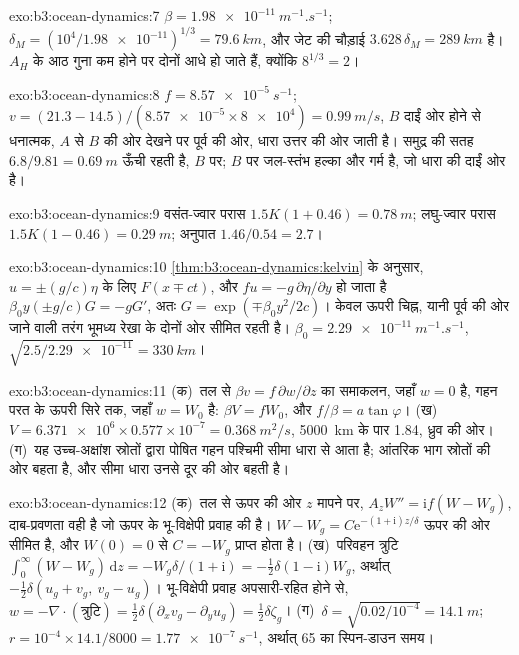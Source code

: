 \begin{solution}{exo:b3:ocean-dynamics:7}
$\beta = \qty{1.98e-11}{m^{-1}.s^{-1}}$; $\delta_M = (10^4/\num{1.98e-11})^{1/3}
= \qty{79.6}{km}$, और जेट की चौड़ाई $3.628\,\delta_M = \qty{289}{km}$ है।
$A_H$ के आठ गुना कम होने पर दोनों आधे हो जाते हैं, क्योंकि $8^{1/3} = 2$।
\end{solution}

\begin{solution}{exo:b3:ocean-dynamics:8}
$f = \qty{8.57e-5}{s^{-1}}$; $v = (21.3 - 14.5)/(\num{8.57e-5}\times\num{8e4})
= \qty{0.99}{m/s}$, $B$ दाईं ओर होने से धनात्मक, $A$ से $B$ की ओर देखने पर
पूर्व की ओर, धारा उत्तर की ओर जाती है। समुद्र की सतह
$6.8/9.81 = \qty{0.69}{m}$ ऊँची रहती है, $B$ पर;
$B$ पर जल-स्तंभ हल्का और गर्म है, जो धारा की दाईं ओर है।
\end{solution}

\begin{solution}{exo:b3:ocean-dynamics:9}
वसंत-ज्वार परास $1.5K(1 + 0.46) = \qty{0.78}{m}$; लघु-ज्वार परास $1.5K(1 - 0.46)
= \qty{0.29}{m}$; अनुपात $1.46/0.54 = 2.7$।
\end{solution}

\begin{solution}{exo:b3:ocean-dynamics:10}
\cref{thm:b3:ocean-dynamics:kelvin} के अनुसार, $u = \pm(g/c)\eta$ के लिए $F(x \mp
ct)$, और $fu = -g\,\partial\eta/\partial y$ हो जाता है $\beta_0y(\pm g/c)G =
-gG'$, अतः $G = \exp(\mp\beta_0y^2/2c)$। केवल ऊपरी चिह्न, यानी पूर्व की ओर जाने वाली
तरंग भूमध्य रेखा के दोनों ओर सीमित रहती है। $\beta_0 =
\qty{2.29e-11}{m^{-1}.s^{-1}}$, $\sqrt{2.5/\num{2.29e-11}} = \qty{330}{km}$।
\end{solution}

\begin{solution}{exo:b3:ocean-dynamics:11}
(क)~तल से $\beta v = f\,\partial w/\partial z$ का समाकलन, जहाँ $w = 0$ है,
गहन परत के ऊपरी सिरे तक, जहाँ $w = W_0$ है: $\beta V = fW_0$, और $f/\beta =
a\tan\varphi$। (ख)~$V = \num{6.371e6}\times0.577\times10^{-7} =
\qty{0.368}{m^2/s}$, \qty{5000}{km} के पार \qty{1.84}{\sverdrup}, ध्रुव की ओर।
(ग)~यह उच्च-अक्षांश स्रोतों द्वारा पोषित गहन पश्चिमी सीमा धारा से आता है;
आंतरिक भाग स्रोतों की ओर बहता है, और सीमा धारा उनसे दूर की ओर
बहती है।
\end{solution}

\begin{solution}{exo:b3:ocean-dynamics:12}
(क)~तल से ऊपर की ओर $z$ मापने पर, $A_zW'' = \mathrm if(W - W_g)$,
दाब-प्रवणता वही है जो ऊपर के भू-विक्षेपी प्रवाह की है। $W - W_g =
C\mathrm e^{-(1+\mathrm i)z/\delta}$ ऊपर की ओर सीमित है, और $W(0) = 0$ से
$C = -W_g$ प्राप्त होता है। (ख)~परिवहन त्रुटि $\int_0^\infty(W - W_g)\,\mathrm dz
= -W_g\delta/(1+\mathrm i) = -\tfrac12\delta(1 - \mathrm i)W_g$, अर्थात्
$-\tfrac12\delta(u_g + v_g,\ v_g - u_g)$। भू-विक्षेपी प्रवाह
अपसारी-रहित होने से, $w = -\nabla\cdot(\text{त्रुटि}) = \tfrac12\delta(\partial_x
v_g - \partial_y u_g) = \tfrac12\delta\zeta_g$। (ग)~$\delta =
\sqrt{0.02/10^{-4}} = \qty{14.1}{m}$; $r = 10^{-4}\times14.1/8000 =
\qty{1.77e-7}{s^{-1}}$, अर्थात् \num{65} का स्पिन-डाउन समय।
\end{solution}

